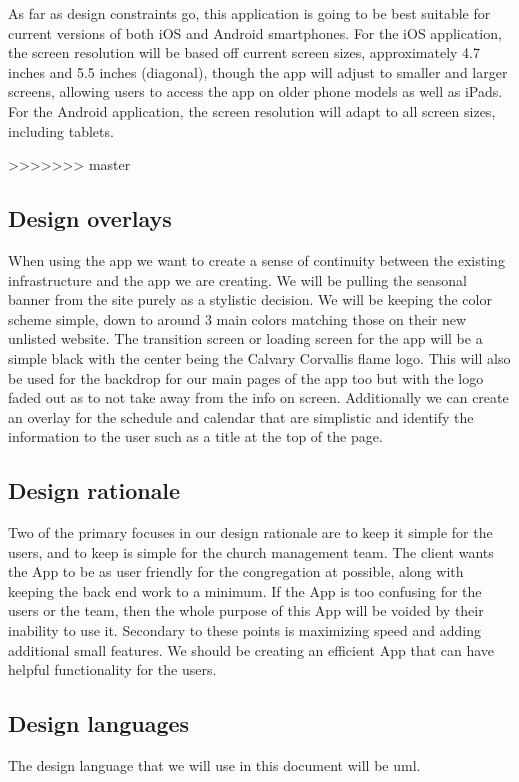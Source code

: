 \documentclass[letterpaper,10pt,draftclsnofoot,onecolumn,titlepage]{IEEEtran}
\begin{document}
			As far as design constraints go, this application is going to be best suitable for current versions of both iOS and Android smartphones.
			For the iOS application, the screen resolution will be based off current screen sizes, approximately 4.7 inches and 5.5 inches (diagonal), though the app will adjust to smaller and larger screens, allowing users to access the app on older phone models as well as iPads.
			For the Android application, the screen resolution will adapt to all screen sizes, including tablets.

>>>>>>> master
		\subsection{Design overlays}
		When using the app we want to create a sense of continuity between the existing infrastructure and the app we are creating.
		We will be pulling the seasonal banner from the site purely as a stylistic decision.
		We will be keeping the color scheme simple, down to around 3 main colors matching those on their new unlisted website.
		The transition screen or loading screen for the app will be a simple black with the center being the Calvary Corvallis flame logo.
		This will also be used for the backdrop for our main pages of the app too but with the logo faded out as to not take away from the info on screen.
		Additionally we can create an overlay for the schedule and calendar that are simplistic and identify the information to the user such as a title at the top of the page.

		\subsection{Design rationale}
		Two of the primary focuses in our design rationale are to keep it simple for the users, and to keep is simple for the church management team.
		The client wants the \gls{App} to be as user friendly for the congregation at possible, along with keeping the back end work to a minimum.
		If the \gls{App} is too confusing for the users or the team, then the whole purpose of this \gls{App} will be voided by their inability to use it.
		Secondary to these points is maximizing speed and adding additional small features.
		We should be creating an efficient \gls{App} that can have helpful functionality for the users.

		\subsection{Design languages}
		The design language that we will use in this document will be \gls{uml}.
\end{document}
